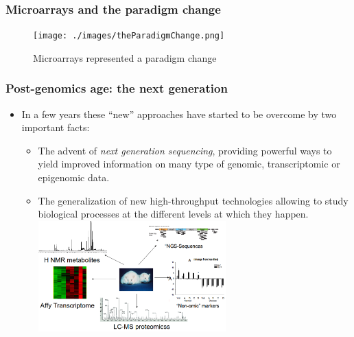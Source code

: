 \documentclass[handout]{beamer}
\begin{document}
\begin{frame}
\frametitle{Microarrays and the paradigm change}
\label{sec-1-2}
\begin{figure}[htb]
\centering
\texttt{[image: ./images/theParadigmChange.png]}
\caption{\label{fig:paradigmChange}Microarrays represented a paradigm change}
\end{figure}
\end{frame}

\begin{frame}
\frametitle{Post-genomics age: the next generation}
\label{sec-1-3}
\begin{itemize}
\item In a few years these ``new'' approaches have started to be overcome by two important facts:
\label{sec-1-3-1}%
\begin{itemize}
\item The advent of \emph{next generation sequencing}, providing powerful ways to yield improved information on many type of genomic, transcriptomic or epigenomic data.
\label{sec-1-3-1-1}%
\item The generalization of new high-throughput technologies allowing to study biological processes at the different levels at which they happen.
\label{sec-1-3-1-2}%
\includegraphics[width=0.6\textwidth]{./images/multipleOmics.png}
\end{itemize} %

\end{itemize} %
\end{frame}
\end{document}

